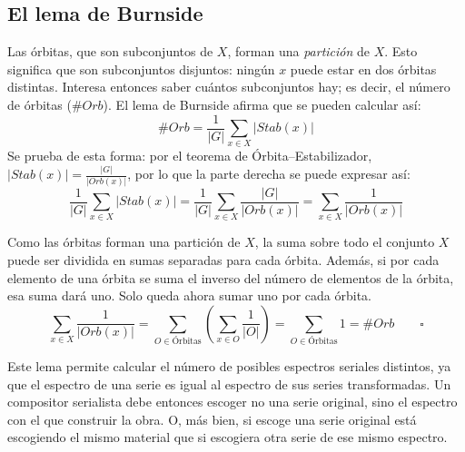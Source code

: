 	\subsection{El lema de Burnside}
		\label{burnside}
		Las \'orbitas, que son subconjuntos de $X$, forman una \emph{partici\'on} de $X$. Esto significa que son subconjuntos disjuntos: ning\'un $x$ puede estar en dos \'orbitas distintas. Interesa entonces saber cu\'antos subconjuntos hay; es decir, el n\'umero de \'orbitas ($\#Orb$). El lema de Burnside afirma que se pueden calcular as\'i:
		\[\#Orb=\frac{1}{|{G}|}\sum_{x\in{X}}|{Stab}(x)|\]	
		Se prueba de esta forma: por el teorema de \'Orbita--Estabilizador, $|{Stab}(x)|=\frac{|{G}|}{|Orb(x)|}$, por lo que la parte derecha se puede expresar as\'i:
		\[\frac{1}{|{G}|}\sum_{x\in X}|{Stab}(x)|=
		\frac{1}{|{G}|}\sum_{x\in X}\frac{|{G}|}{|Orb(x)|}=
		\sum_{x\in X}\frac{1}{|Orb(x)|}\]

		Como las \'orbitas forman una partici\'on de $X$, la suma sobre todo el conjunto $X$ puede ser dividida en sumas separadas para cada \'orbita. Adem\'as, si por cada elemento de una \'orbita se suma el inverso del n\'umero de elementos de la \'orbita, esa suma dar\'a uno. Solo queda ahora sumar uno por cada \'orbita.
		\[\sum_{x\in X}\frac{1}{|Orb(x)|}=\sum_{{O}\in\mbox{\'Orbitas}}\left(\sum_{x\in{O}}\frac{1}{|{O}|}\right)=\sum_{O\in\mbox{\'Orbitas}}1=\#Orb \qquad\square\]	
	
		Este lema permite calcular el n\'umero de posibles espectros seriales distintos, ya que el espectro de una serie es igual al espectro de sus series transformadas. Un compositor serialista debe entonces escoger no una serie original, sino el espectro con el que construir la obra. O, m\'as bien, si escoge una serie original est\'a escogiendo el mismo material que si escogiera otra serie de ese mismo espectro.